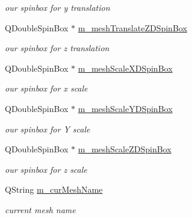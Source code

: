 \begin{DoxyCompactItemize}
\begin{DoxyCompactList}\small\item\em our spinbox for y translation \end{DoxyCompactList}\item 
\hypertarget{class_mesh_widget_ad421ee8459363aaa4641a629e14c8d3e}{Q\-Double\-Spin\-Box $\ast$ \hyperlink{class_mesh_widget_ad421ee8459363aaa4641a629e14c8d3e}{m\-\_\-mesh\-Translate\-Z\-D\-Spin\-Box}}\label{class_mesh_widget_ad421ee8459363aaa4641a629e14c8d3e}

\begin{DoxyCompactList}\small\item\em our spinbox for z translation \end{DoxyCompactList}\item 
\hypertarget{class_mesh_widget_ad0727eeb3046c2a4e219dc0702b02f4a}{Q\-Double\-Spin\-Box $\ast$ \hyperlink{class_mesh_widget_ad0727eeb3046c2a4e219dc0702b02f4a}{m\-\_\-mesh\-Scale\-X\-D\-Spin\-Box}}\label{class_mesh_widget_ad0727eeb3046c2a4e219dc0702b02f4a}

\begin{DoxyCompactList}\small\item\em our spinbox for x scale \end{DoxyCompactList}\item 
\hypertarget{class_mesh_widget_abbbc813dffc7918cdc1575ecfc8d9059}{Q\-Double\-Spin\-Box $\ast$ \hyperlink{class_mesh_widget_abbbc813dffc7918cdc1575ecfc8d9059}{m\-\_\-mesh\-Scale\-Y\-D\-Spin\-Box}}\label{class_mesh_widget_abbbc813dffc7918cdc1575ecfc8d9059}

\begin{DoxyCompactList}\small\item\em our spinbox for Y scale \end{DoxyCompactList}\item 
\hypertarget{class_mesh_widget_a39ffc5b350c23735bb883366975289e0}{Q\-Double\-Spin\-Box $\ast$ \hyperlink{class_mesh_widget_a39ffc5b350c23735bb883366975289e0}{m\-\_\-mesh\-Scale\-Z\-D\-Spin\-Box}}\label{class_mesh_widget_a39ffc5b350c23735bb883366975289e0}

\begin{DoxyCompactList}\small\item\em our spinbox for z scale \end{DoxyCompactList}\item 
\hypertarget{class_mesh_widget_a601eabcfd24a5918de58f19a6911bfcd}{Q\-String \hyperlink{class_mesh_widget_a601eabcfd24a5918de58f19a6911bfcd}{m\-\_\-cur\-Mesh\-Name}}\label{class_mesh_widget_a601eabcfd24a5918de58f19a6911bfcd}

\begin{DoxyCompactList}\small\item\em current mesh name \end{DoxyCompactList}\end{DoxyCompactItemize}
